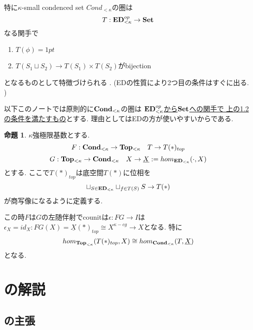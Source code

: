 \documentclass[dvipdfmx,a4paper,11pt]{report}
\theoremstyle{definition}
\newtheorem{prop}[thm]{命題}
\begin{document}
特に$\kappa$-small condenced set $Cond_{<\kappa}$の圏は
$$
T : {\bf ED}_{< \kappa}^{op} \to {\bf Set}
$$
なる関手で
\begin{enumerate}
\item $T(\phi) = 1pt$
\item $T(S_1 \sqcup S_2) \to T(S_1) \times T(S_2)$がbijection
\end{enumerate}
となるものとして特徴づけられる .
(EDの性質により2つ目の条件はすぐに出る. )

以下このノートでは原則的に${ \bf Cond}_{<\kappa}$の圏は
\underline{${\bf ED}_{< \kappa}^{op}$から${\bf Set}$への関手で 
上の1.2の条件を満たすもの}とする. 理由としてはEDの方が使いやすいからである.


\begin{tcolorbox}
 [colback = white, colframe = green!35!black, fonttitle = \bfseries,breakable = true]
\begin{prop}\cite[proposition 1.7]{Sch19}
$\kappa$強極限基数とする. 
$$
F : {\bf Cond}_{< \kappa} \to {\bf Top_{<\kappa}} \quad T \to T(\ast)_{top}
$$
$$
G :  {\bf Top_{<\kappa}} \to {\bf Cond}_{< \kappa} \quad X \to \underline{X}:=hom_{{\bf ED}_{<\kappa}}(\cdot, X)
$$
とする. 
ここで$T(\ast)_{top}$は底空間$T(\ast)$に位相を
$$
\sqcup_{S \in {\bf ED}_{<\kappa}}  \sqcup_{f \in T(S) }  S \to T(\ast)
$$
が商写像になるように定義する.

この時$F$は$G$の左随伴射でcounitは$\epsilon : FG \to I$は$\epsilon_{X}=id_{X}: FG(X)=\underline{X}(\ast)_{top}\cong X^{\kappa-cg} \to X$となる. 
特に
$$
hom_{{\bf Top}_{<\kappa}}(T(\ast)_{top}, X) \cong hom_{{\bf Cond}_{<\kappa}}(T, \underline{X})
$$
となる. 
 \end{prop}
 \end{tcolorbox}



\section{\cite[Proposition 2.9]{Sch19}の解説}



\subsection{\cite[Proposition 2.9]{Sch19}の主張}
\end{document}
